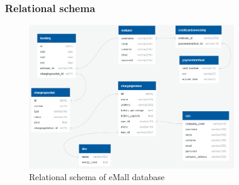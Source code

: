 \subsubsection{Relational schema}
\begin{figure}[H]
    \centering
    \includegraphics[width=0.8\textwidth]{images/db_structure.png}
    \caption{Relational schema of eMall database}
    \label{fig:dbstructure}
\end{figure}
